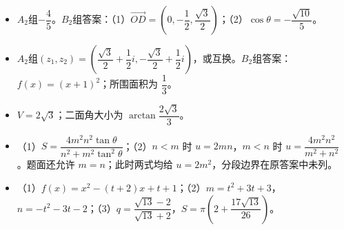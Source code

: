\begin{itemize}[leftmargin=2.6em]
  \item[\textbf{21.}] $A_2$组$-\dfrac45$。$B_2$组答案：（1）$\overrightarrow{OD}=\left(0,-\dfrac12,\dfrac{\sqrt3}{2}\right)$；（2）$\cos\theta=-\dfrac{\sqrt{10}}5$。
  \item[\textbf{22.}] $A_2$组$(z_1,z_2)=\left(\dfrac{\sqrt3}{2}+\dfrac12i,-\dfrac{\sqrt3}{2}+\dfrac12i\right)$，或互换。$B_2$组答案：$f(x)=(x+1)^2$；所围面积为 $\dfrac13$。
  \item[\textbf{23.}] $V=2\sqrt3$；二面角大小为 $\arctan\dfrac{2\sqrt3}{3}$。
  \item[\textbf{24.}] （1）$S=\dfrac{4m^2n^2\tan\theta}{n^2+m^2\tan^2\theta}$；（2）$n<m$ 时 $u=2mn$，$m<n$ 时 $u=\dfrac{4m^2n^2}{m^2+n^2}$。题面还允许 $m=n$；此时两式均给 $u=2m^2$，分段边界在原答案中未列。
  \item[\textbf{25.}] （1）$f(x)=x^2-(t+2)x+t+1$；（2）$m=t^2+3t+3$，$n=-t^2-3t-2$；（3）$q=\dfrac{\sqrt{13}-2}{\sqrt{13}+2}$，$S=\pi\left(2+\dfrac{17\sqrt{13}}{26}\right)$。
\end{itemize}
